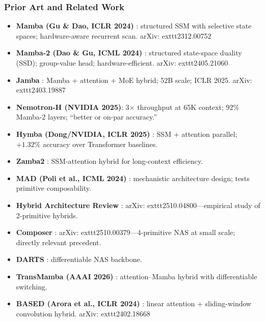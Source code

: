 \documentclass[11pt]{article}
\begin{document}
\subsubsection*{Prior Art and Related Work}
\begin{itemize}
  \item \textbf{Mamba (Gu \& Dao, ICLR 2024)} \cite{GuDao2024}: structured SSM with selective state spaces; hardware-aware recurrent scan.
    arXiv:	exttt{2312.00752}

  \item \textbf{Mamba-2 (Dao \& Gu, ICML 2024)} \cite{DaoGu2024}: structured state-space duality (SSD); group-value head; hardware-efficient.
    arXiv:	exttt{2405.21060}

  \item \textbf{Jamba} \cite{LieberEtAl2024}: Mamba + attention + MoE hybrid; 52B scale; ICLR 2025.
    arXiv:	exttt{2403.19887}

  \item \textbf{Nemotron-H (NVIDIA 2025)}: 3$\times$ throughput at 65K context; 92\% Mamba-2 layers; ``better or on-par accuracy.''

  \item \textbf{Hymba (Dong/NVIDIA, ICLR 2025)} \cite{DongEtAl2024Hymba}: SSM + attention parallel; $+1.32\%$ accuracy over Transformer baselines.

  \item \textbf{Zamba2} \cite{GloriosaEtAl2024}: SSM-attention hybrid for long-context efficiency.

  \item \textbf{MAD (Poli et al., ICML 2024)} \cite{PoliEtAl2024}: mechanistic architecture design; tests primitive composability.

  \item \textbf{Hybrid Architecture Review} \cite{HybridReview2024}: arXiv:	exttt{2510.04800}---empirical study of 2-primitive hybrids.

  \item \textbf{Composer} \cite{Composer2024}: arXiv:	exttt{2510.00379}---4-primitive NAS at small scale; directly relevant precedent.

  \item \textbf{DARTS} \cite{LiuSiEtAl2019}: differentiable NAS backbone.

  \item \textbf{TransMamba (AAAI 2026)} \cite{TransMamba2026}: attention--Mamba hybrid with differentiable switching.

  \item \textbf{BASED (Arora et al., ICLR 2024)} \cite{AroraEtAl2024}: linear attention + sliding-window convolution hybrid.
    arXiv:	exttt{2402.18668}
\end{itemize}
\end{document}

